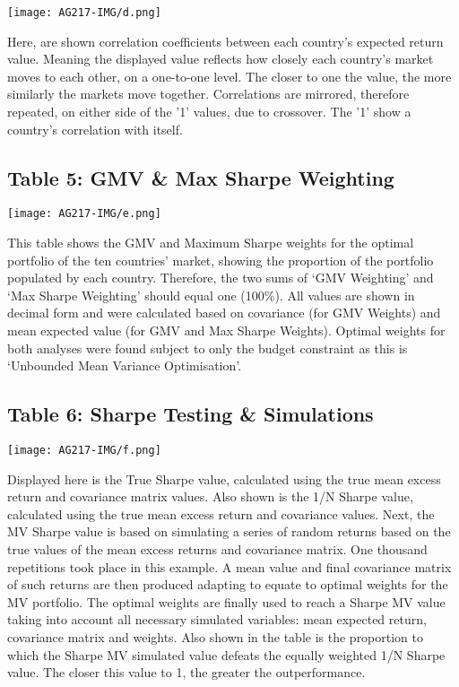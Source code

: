 \documentclass[11pt, english]{article}
\begin{document}
	\begin{center}
                \texttt{[image: AG217-IMG/d.png]}    
        \end{center}

	Here, are shown correlation coefficients between each country's expected return value. Meaning the displayed value reflects how closely each country's market moves to each other, on a one-to-one level. The closer to one the value, the more similarly the markets move together. Correlations are mirrored, therefore repeated, on either side of the '1' values, due to crossover. The '1' show a country's correlation with itself.

	\subsection{Table 5: GMV \& Max Sharpe Weighting}
	
	\begin{center}
                \texttt{[image: AG217-IMG/e.png]}    
        \end{center}

	This table shows the GMV and Maximum Sharpe weights for the optimal portfolio of the ten countries' market, showing the proportion of the portfolio populated by each country. Therefore, the two sums of `GMV Weighting' and `Max Sharpe Weighting' should equal one (100\%). All values are shown in decimal form and were calculated based on covariance (for GMV Weights) and mean expected value (for GMV and Max Sharpe Weights). Optimal weights for both analyses were found subject to only the budget constraint as this is `Unbounded Mean Variance Optimisation'. 

	\subsection{Table 6: Sharpe Testing \& Simulations}

	\begin{center}
                \texttt{[image: AG217-IMG/f.png]}    
        \end{center}

	Displayed here is the True Sharpe value, calculated using the true mean excess return and covariance matrix values. Also shown is the 1/N Sharpe value, calculated using the true mean excess return and covariance values. Next, the MV Sharpe value is based on simulating a series of random returns based on the true values of the mean excess returns and covariance matrix. One thousand repetitions took place in this example. A mean value and final covariance matrix of such returns are then produced adapting to equate to optimal weights for the MV portfolio. The optimal weights are finally used to reach a Sharpe MV value taking into account all necessary simulated variables: mean expected return, covariance matrix and weights. Also shown in the table is the proportion to which the Sharpe MV simulated value defeats the equally weighted 1/N Sharpe value. The closer this value to 1, the greater the outperformance.
\end{document}
